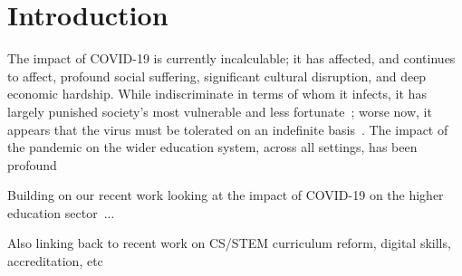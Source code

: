 \documentclass[sigconf]{acmart}
\begin{document}


\maketitle

\section{Introduction}\label{intro}

The impact of COVID-19 is currently incalculable; it has affected, and
continues to affect, profound social suffering, significant cultural
disruption, and deep economic hardship. While indiscriminate in terms
of whom it infects, it has largely punished society’s most vulnerable
and less fortunate~\cite{vonbraun-et-al:2020,lancetcovid:2020}; worse
now, it appears that the virus must be tolerated on an indefinite
basis~\cite{kissler-et-al:2020}. The impact of the pandemic on the
wider education system, across all settings, has been
profound~\cite{oecdcovidedu:2020,armitage+nellums:2020}

Building on our recent work looking at the impact of COVID-19 on the higher
education sector~\cite{watermeyer-et-al:he2020}...

Also linking back to recent work on CS/STEM curriculum reform, digital
skills, accreditation,
etc~\cite{brown-et-al-toce2014,tryfonas+crick:petra2018,crick-et-al:fie2019,davenport-et-al:educon2020,prickett-et-al:iticse2020}
\end{document}
